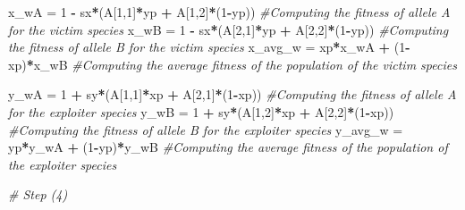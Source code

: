 \documentclass[
]{book}
\newenvironment{Shaded}{\begin{snugshade}}{\end{snugshade}}
\newcommand{\CommentTok}[1]{\textcolor[rgb]{0.56,0.35,0.01}{\textit{#1}}}
\newcommand{\DecValTok}[1]{\textcolor[rgb]{0.00,0.00,0.81}{#1}}
\newcommand{\NormalTok}[1]{#1}
\newcommand{\OtherTok}[1]{\textcolor[rgb]{0.56,0.35,0.01}{#1}}
\newcommand{\SpecialCharTok}[1]{\textcolor[rgb]{0.81,0.36,0.00}{\textbf{#1}}}
\begin{document}
\begin{Shaded}
\begin{Highlighting}[]
\NormalTok{  x\_wA }\OtherTok{=} \DecValTok{1} \SpecialCharTok{{-}}\NormalTok{ sx}\SpecialCharTok{*}\NormalTok{(A[}\DecValTok{1}\NormalTok{,}\DecValTok{1}\NormalTok{]}\SpecialCharTok{*}\NormalTok{yp }\SpecialCharTok{+}\NormalTok{ A[}\DecValTok{1}\NormalTok{,}\DecValTok{2}\NormalTok{]}\SpecialCharTok{*}\NormalTok{(}\DecValTok{1}\SpecialCharTok{{-}}\NormalTok{yp)) }\CommentTok{\#Computing the fitness of allele A for the victim species}
\NormalTok{  x\_wB }\OtherTok{=} \DecValTok{1} \SpecialCharTok{{-}}\NormalTok{ sx}\SpecialCharTok{*}\NormalTok{(A[}\DecValTok{2}\NormalTok{,}\DecValTok{1}\NormalTok{]}\SpecialCharTok{*}\NormalTok{yp }\SpecialCharTok{+}\NormalTok{ A[}\DecValTok{2}\NormalTok{,}\DecValTok{2}\NormalTok{]}\SpecialCharTok{*}\NormalTok{(}\DecValTok{1}\SpecialCharTok{{-}}\NormalTok{yp)) }\CommentTok{\#Computing the fitness of allele B for the victim species}
\NormalTok{  x\_avg\_w }\OtherTok{=}\NormalTok{ xp}\SpecialCharTok{*}\NormalTok{x\_wA }\SpecialCharTok{+}\NormalTok{ (}\DecValTok{1}\SpecialCharTok{{-}}\NormalTok{xp)}\SpecialCharTok{*}\NormalTok{x\_wB }\CommentTok{\#Computing the average fitness of the population of the victim species}

\NormalTok{  y\_wA }\OtherTok{=} \DecValTok{1} \SpecialCharTok{+}\NormalTok{ sy}\SpecialCharTok{*}\NormalTok{(A[}\DecValTok{1}\NormalTok{,}\DecValTok{1}\NormalTok{]}\SpecialCharTok{*}\NormalTok{xp }\SpecialCharTok{+}\NormalTok{ A[}\DecValTok{2}\NormalTok{,}\DecValTok{1}\NormalTok{]}\SpecialCharTok{*}\NormalTok{(}\DecValTok{1}\SpecialCharTok{{-}}\NormalTok{xp)) }\CommentTok{\#Computing the fitness of allele A for the exploiter species}
\NormalTok{  y\_wB }\OtherTok{=} \DecValTok{1} \SpecialCharTok{+}\NormalTok{ sy}\SpecialCharTok{*}\NormalTok{(A[}\DecValTok{1}\NormalTok{,}\DecValTok{2}\NormalTok{]}\SpecialCharTok{*}\NormalTok{xp }\SpecialCharTok{+}\NormalTok{ A[}\DecValTok{2}\NormalTok{,}\DecValTok{2}\NormalTok{]}\SpecialCharTok{*}\NormalTok{(}\DecValTok{1}\SpecialCharTok{{-}}\NormalTok{xp)) }\CommentTok{\#Computing the fitness of allele B for the exploiter species}
\NormalTok{  y\_avg\_w }\OtherTok{=}\NormalTok{ yp}\SpecialCharTok{*}\NormalTok{y\_wA }\SpecialCharTok{+}\NormalTok{ (}\DecValTok{1}\SpecialCharTok{{-}}\NormalTok{yp)}\SpecialCharTok{*}\NormalTok{y\_wB }\CommentTok{\#Computing the average fitness of the population of the exploiter species}
  
  \CommentTok{\# Step (4)}
  

\end{Highlighting}
\end{Shaded}
\end{document}
